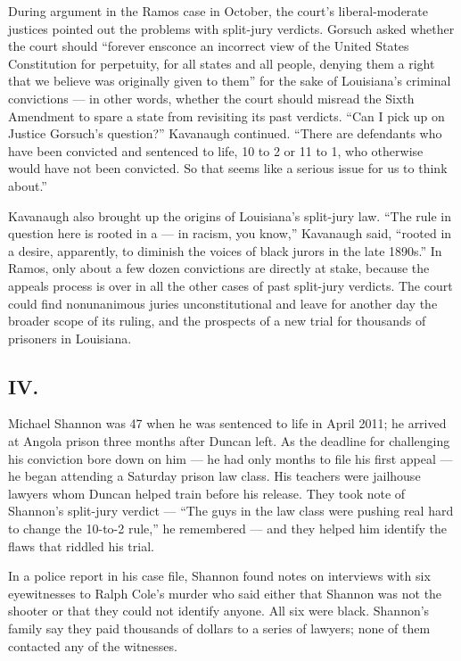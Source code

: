 During argument in the Ramos case in October, the court's
liberal-moderate justices pointed out the problems with split-jury
verdicts. Gorsuch asked whether the court should ``forever ensconce an
incorrect view of the United States Constitution for perpetuity, for all
states and all people, denying them a right that we believe was
originally given to them'' for the sake of Louisiana's criminal
convictions --- in other words, whether the court should misread the
Sixth Amendment to spare a state from revisiting its past verdicts.
``Can I pick up on Justice Gorsuch's question?'' Kavanaugh continued.
``There are defendants who have been convicted and sentenced to life, 10
to 2 or 11 to 1, who otherwise would have not been convicted. So that
seems like a serious issue for us to think about.''

Kavanaugh also brought up the origins of Louisiana's split-jury law.
``The rule in question here is rooted in a --- in racism, you know,''
Kavanaugh said, ``rooted in a desire, apparently, to diminish the voices
of black jurors in the late 1890s.'' In Ramos, only about a few dozen
convictions are directly at stake, because the appeals process is over
in all the other cases of past split-jury verdicts. The court could find
nonunanimous juries unconstitutional and leave for another day the
broader scope of its ruling, and the prospects of a new trial for
thousands of prisoners in Louisiana.

\hypertarget{iv}{%
\subsection{IV.}\label{iv}}

Michael Shannon was 47 when he was sentenced to life in April 2011; he
arrived at Angola prison three months after Duncan left. As the deadline
for challenging his conviction bore down on him --- he had only months
to file his first appeal --- he began attending a Saturday prison law
class. His teachers were jailhouse lawyers whom Duncan helped train
before his release. They took note of Shannon's split-jury verdict ---
``The guys in the law class were pushing real hard to change the 10-to-2
rule,'' he remembered --- and they helped him identify the flaws that
riddled his trial.

In a police report in his case file, Shannon found notes on interviews
with six eyewitnesses to Ralph Cole's murder who said either that
Shannon was not the shooter or that they could not identify anyone. All
six were black. Shannon's family say they paid thousands of dollars to a
series of lawyers; none of them contacted any of the witnesses.


